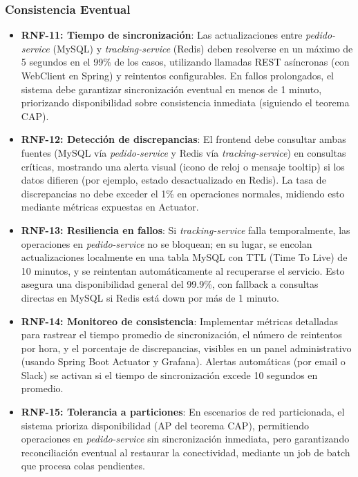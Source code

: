 \documentclass[a4paper,12pt]{article}
\begin{document}
\subsubsection{Consistencia Eventual}
\begin{itemize}
    \item \textbf{RNF-11: Tiempo de sincronización}: Las actualizaciones entre \textit{pedido-service} (MySQL) y \textit{tracking-service} (Redis) deben resolverse en un máximo de 5 segundos en el 99\% de los casos, utilizando llamadas REST asíncronas (con WebClient en Spring) y reintentos configurables. En fallos prolongados, el sistema debe garantizar sincronización eventual en menos de 1 minuto, priorizando disponibilidad sobre consistencia inmediata (siguiendo el teorema CAP).
    
    \item \textbf{RNF-12: Detección de discrepancias}: El frontend debe consultar ambas fuentes (MySQL vía \textit{pedido-service} y Redis vía \textit{tracking-service}) en consultas críticas, mostrando una alerta visual (icono de reloj o mensaje tooltip) si los datos difieren (por ejemplo, estado desactualizado en Redis). La tasa de discrepancias no debe exceder el 1\% en operaciones normales, midiendo esto mediante métricas expuestas en Actuator.
    
    \item \textbf{RNF-13: Resiliencia en fallos}: Si \textit{tracking-service} falla temporalmente, las operaciones en \textit{pedido-service} no se bloquean; en su lugar, se encolan actualizaciones localmente en una tabla MySQL con TTL (Time To Live) de 10 minutos, y se reintentan automáticamente al recuperarse el servicio. Esto asegura una disponibilidad general del 99.9\%, con fallback a consultas directas en MySQL si Redis está down por más de 1 minuto.
    
    \item \textbf{RNF-14: Monitoreo de consistencia}: Implementar métricas detalladas para rastrear el tiempo promedio de sincronización, el número de reintentos por hora, y el porcentaje de discrepancias, visibles en un panel administrativo (usando Spring Boot Actuator y Grafana). Alertas automáticas (por email o Slack) se activan si el tiempo de sincronización excede 10 segundos en promedio.
    
    \item \textbf{RNF-15: Tolerancia a particiones}: En escenarios de red particionada, el sistema prioriza disponibilidad (AP del teorema CAP), permitiendo operaciones en \textit{pedido-service} sin sincronización inmediata, pero garantizando reconciliación eventual al restaurar la conectividad, mediante un job de batch que procesa colas pendientes.
\end{itemize}
\end{document}
